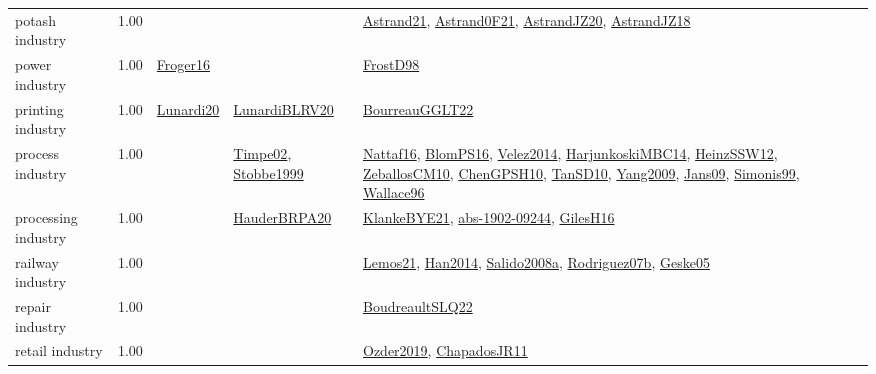 {\begin{longtable}{p{3cm}r>{\raggedright\arraybackslash}p{6cm}>{\raggedright\arraybackslash}p{6cm}>{\raggedright\arraybackslash}p{8cm}}
\index{potash industry}\index{Industries!potash industry}potash industry &  1.00 &  &  & \hyperref[detail:Astrand21]{Astrand21}, \hyperref[detail:Astrand0F21]{Astrand0F21}, \hyperref[detail:AstrandJZ20]{AstrandJZ20}, \hyperref[detail:AstrandJZ18]{AstrandJZ18}\\
\index{power industry}\index{Industries!power industry}power industry &  1.00 & \hyperref[detail:Froger16]{Froger16} &  & \hyperref[detail:FrostD98]{FrostD98}\\
\index{printing industry}\index{Industries!printing industry}printing industry &  1.00 & \hyperref[detail:Lunardi20]{Lunardi20} & \hyperref[detail:LunardiBLRV20]{LunardiBLRV20} & \hyperref[detail:BourreauGGLT22]{BourreauGGLT22}\\
\index{process industry}\index{Industries!process industry}process industry &  1.00 &  & \hyperref[detail:Timpe02]{Timpe02}, \hyperref[detail:Stobbe1999]{Stobbe1999} & \hyperref[detail:Nattaf16]{Nattaf16}, \hyperref[detail:BlomPS16]{BlomPS16}, \hyperref[detail:Velez2014]{Velez2014}, \hyperref[detail:HarjunkoskiMBC14]{HarjunkoskiMBC14}, \hyperref[detail:HeinzSSW12]{HeinzSSW12}, \hyperref[detail:ZeballosCM10]{ZeballosCM10}, \hyperref[detail:ChenGPSH10]{ChenGPSH10}, \hyperref[detail:TanSD10]{TanSD10}, \hyperref[detail:Yang2009]{Yang2009}, \hyperref[detail:Jans09]{Jans09}, \hyperref[detail:Simonis99]{Simonis99}, \hyperref[detail:Wallace96]{Wallace96}\\
\index{processing industry}\index{Industries!processing industry}processing industry &  1.00 &  & \hyperref[detail:HauderBRPA20]{HauderBRPA20} & \hyperref[detail:KlankeBYE21]{KlankeBYE21}, \hyperref[detail:abs-1902-09244]{abs-1902-09244}, \hyperref[detail:GilesH16]{GilesH16}\\
\index{railway industry}\index{Industries!railway industry}railway industry &  1.00 &  &  & \hyperref[detail:Lemos21]{Lemos21}, \hyperref[detail:Han2014]{Han2014}, \hyperref[detail:Salido2008a]{Salido2008a}, \hyperref[detail:Rodriguez07b]{Rodriguez07b}, \hyperref[detail:Geske05]{Geske05}\\
\index{repair industry}\index{Industries!repair industry}repair industry &  1.00 &  &  & \hyperref[detail:BoudreaultSLQ22]{BoudreaultSLQ22}\\
\index{retail industry}\index{Industries!retail industry}retail industry &  1.00 &  &  & \hyperref[detail:Ozder2019]{Ozder2019}, \hyperref[detail:ChapadosJR11]{ChapadosJR11}\\

\end{longtable}}
